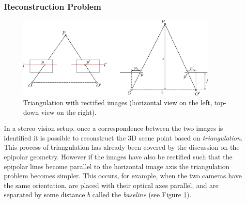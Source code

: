 \subsubsection{Reconstruction Problem}

\begin{figure}[ht]
\centering
\includegraphics[width=0.9\textwidth]{tex/figs/ch09_figs/triangulation.png}
\caption{Triangulation with rectified images (horizontal view on the left, top-down view on the right).}
\label{fig:recttri}
\end{figure}
In a stereo vision setup, once a correspondence between the two images is identified it is possible to reconstruct the 3D scene point based on \textit{triangulation}. This process of triangulation has already been covered by the discussion on the epipolar geometry. However if the images have also be rectified such that the epipolar lines become parallel to the horizontal image axis the triangulation problem becomes simpler. This occurs, for example, when the two cameras have the same orientation, are placed with their optical axes parallel, and are separated by some distance $b$ called the \textit{baseline} (see Figure \ref{fig:recttri}).

